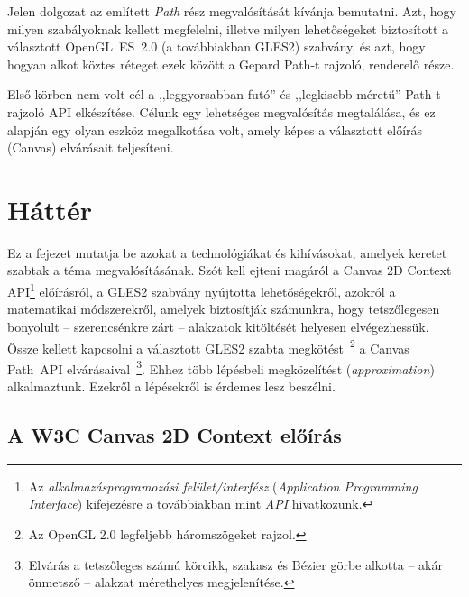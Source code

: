 \documentclass[12pt]{report}
\theoremstyle{definition}
\newcommand{\inenglish}[1]{\textsl{#1}}
\begin{document}
Jelen dolgozat az említett \emph{Path} rész megvalósítását kívánja bemutatni.
Azt, hogy milyen szabályoknak kellett megfelelni, illetve milyen lehetőségeket
biztosított a választott OpenGL~ES~2.0 (a továbbiakban GLES2) szabvány, és azt,
hogy hogyan alkot köztes réteget ezek között a Gepard Path-t rajzoló, renderelő
része.

Első körben nem volt cél a ,,leggyorsabban futó'' és ,,legkisebb méretű''
Path-t rajzoló API elkészítése. Célunk egy lehetséges megvalósítás megtalálása,
és ez alapján egy olyan eszköz megalkotása volt, amely képes a választott
előírás (Canvas) elvárásait teljesíteni.



    \chapter{Háttér}
    \label{sec:Háttér}

Ez a fejezet mutatja be azokat a technológiákat és kihívásokat, amelyek keretet
szabtak a téma megvalósításának. Szót kell ejteni magáról a Canvas 2D Context
API\footnote{Az \emph{alkalmazásprogramozási felület/interfész}
(\inenglish{Application Programming Interface}) kifejezésre a továbbiakban mint
\emph{API} hivatkozunk.} előírásról, a GLES2 szabvány nyújtotta lehetőségekről,
azokról a matematikai módszerekről, amelyek biztosítják számunkra, hogy
tetszőlegesen bonyolult -- szerencsénkre zárt -- alakzatok kitöltését helyesen
elvégezhessük. Össze kellett kapcsolni a választott GLES2 szabta
megkötést~\footnote { Az OpenGL 2.0 legfeljebb háromszögeket rajzol. } a Canvas
Path~API elvárásaival~\footnote { Elvárás a tetszőleges számú körcikk, szakasz
és Bézier görbe alkotta -- akár önmetsző -- alakzat mérethelyes megjelenítése.
}. Ehhez több lépésbeli megközelítést (\inenglish{approximation}) alkalmaztunk.
Ezekről a lépésekről is érdemes lesz beszélni.

    \section[A Canvas 2D Context előírás]{A W3C Canvas 2D Context előírás}
    \label{sec:A_Canvas_előírás}
\end{document}
